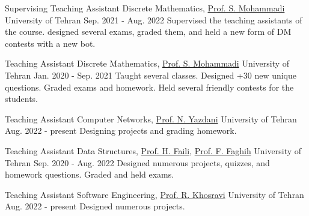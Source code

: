 \begin{cventries}

  \tchentry
    {Supervising Teaching Assistant} %
    {Discrete Mathematics, \href{https://ece.ut.ac.ir/en/~smohamadi}{Prof. S. Mohammadi}} %
    {University of Tehran} %
    {Sep. 2021 - Aug. 2022} %
    {
      Supervised the teaching assistants of the course. designed several exams, graded them, and held a new form of DM contests with a new bot.
    }


\tchentry
    {Teaching Assistant} %
    {Discrete Mathematics, \href{https://ece.ut.ac.ir/en/~smohamadi}{Prof. S. Mohammadi}} %
    {University of Tehran} %
    {Jan. 2020 - Sep. 2021} %
    {
      Taught several classes. Designed +30 new unique questions. Graded exams and homework. Held several friendly contests for the students.
    }


\tchentry
    {Teaching Assistant} %
    {Computer Networks, \href{https://ece.ut.ac.ir/en/~yazdani}{Prof. N. Yazdani}} %
    {University of Tehran} %
    {Aug. 2022 - present} %
    {
      Designing projects and grading homework.
    }


\tchentry
    {Teaching Assistant} %
    {Data Structures, \href{https://ece.ut.ac.ir/en/~hfaili}{Prof. H. Faili}, \href{https://ece.ut.ac.ir/en/~f.faghih}{Prof. F. Faghih}} %
    {University of Tehran} %
    {Sep. 2020 - Aug. 2022} %
    {
      Designed numerous projects, quizzes, and homework questions. Graded and held exams.
    }


\tchentry
    {Teaching Assistant} %
    {Software Engineering, \href{https://ece.ut.ac.ir/en/~r.khosravi}{Prof. R. Khosravi}} %
    {University of Tehran} %
    {Aug. 2022 - present} %
    {
      Designed numerous projects.
    }


\end{cventries}
